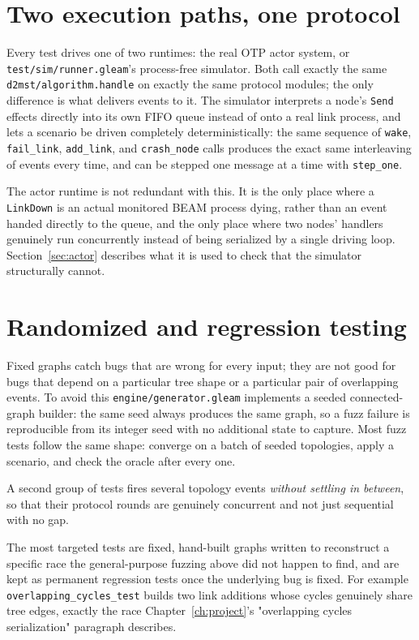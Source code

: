\section{Two execution paths, one protocol}

Every test drives one of two runtimes: the real OTP
actor system, or \texttt{test/sim/runner.gleam}'s process-free simulator. Both call exactly
the same \texttt{d2mst/algorithm.handle} on exactly the same protocol modules; the only
difference is what delivers events to it. The simulator interprets a node's \texttt{Send}
effects directly into its own FIFO queue instead of onto a real link process, and lets a
scenario be driven completely deterministically: the same sequence of \texttt{wake},
\texttt{fail\_link}, \texttt{add\_link}, and \texttt{crash\_node} calls produces the exact
same interleaving of events every time, and can be stepped one message at a time with
\texttt{step\_one}.

The actor runtime is not redundant with this. It is the only place where a
\texttt{LinkDown} is an actual monitored BEAM process dying, rather than an event handed
directly to the queue, and the only place where two nodes' handlers genuinely run
concurrently instead of being serialized by a single driving loop. Section~\ref{sec:actor}
describes what it is used to check that the simulator structurally cannot.

\section{Randomized and regression testing}\label{sec:fuzz}

Fixed graphs catch bugs that are wrong for every input; they are not good for bugs that
depend on a particular tree shape or a particular pair of overlapping events. To avoid this 
\texttt{engine/generator.gleam} implements a seeded connected-graph builder: the same seed 
always produces the same graph, so a fuzz failure is reproducible from its integer seed with 
no additional state to capture. Most fuzz tests follow the same shape: converge on a batch 
of seeded topologies, apply a scenario, and check the oracle after every one.

A second group of tests fires several topology events \emph{without settling in between},
so that their protocol rounds are genuinely concurrent and not just sequential with no gap.

The most targeted tests are fixed, hand-built
graphs written to reconstruct a specific race the general-purpose fuzzing above did not
happen to find, and are kept as permanent regression tests once the underlying bug is
fixed. For example \texttt{overlapping\_cycles\_test} builds two link additions whose cycles genuinely
share tree edges, exactly the race Chapter~\ref{ch:project}'s "overlapping cycles
serialization" paragraph describes.

